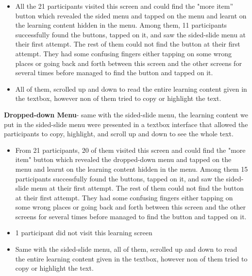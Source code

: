 \begin{itemize} 

\item All the 21 participants visited this screen and could find the "more item'' button which revealed the sided menu and tapped on the menu and learnt on the learning content hidden in the menu. Among them, 11 participants successfully found the buttons, tapped on it, and saw the sided-slide menu at their first attempt. The rest of them could not find the button at their first attempt. They had some confusing fingers either tapping on some wrong places or going back and forth between this screen and the other screens for several times before managed to find the button and tapped on it. 

\item All of them, scrolled up and down to read the entire learning content given in the textbox, however non of them tried to copy or highlight the text. 

\end{itemize} 



\noindent\textbf{Dropped-down Menu}- same with the sided-slide menu, the learning content we put in the sided-slide menu were presented in a textbox interface that allowed the participants to copy, highlight, and scroll up and down to see the whole text.

\begin{itemize}
\item From 21 participants, 20 of them visited this screen and could find the "more item" button which revealed the dropped-down menu and tapped on the menu and learnt on the learning content hidden in the menu. Among them 15 participants successfully found the buttons, tapped on it, and saw the sided-slide menu at their first attempt. The rest of them could not find the button at their first attempt. They had some confusing fingers either tapping on some wrong places or going back and forth between this screen and the other screens for several times before managed to find the button and tapped on it. 
\item 1 participant did not visit this learning screen 
\item Same with the sided-slide menu, all of them, scrolled up and down to read the entire learning content given in the textbox, however non of them tried to copy or highlight the text. 
\end{itemize}

